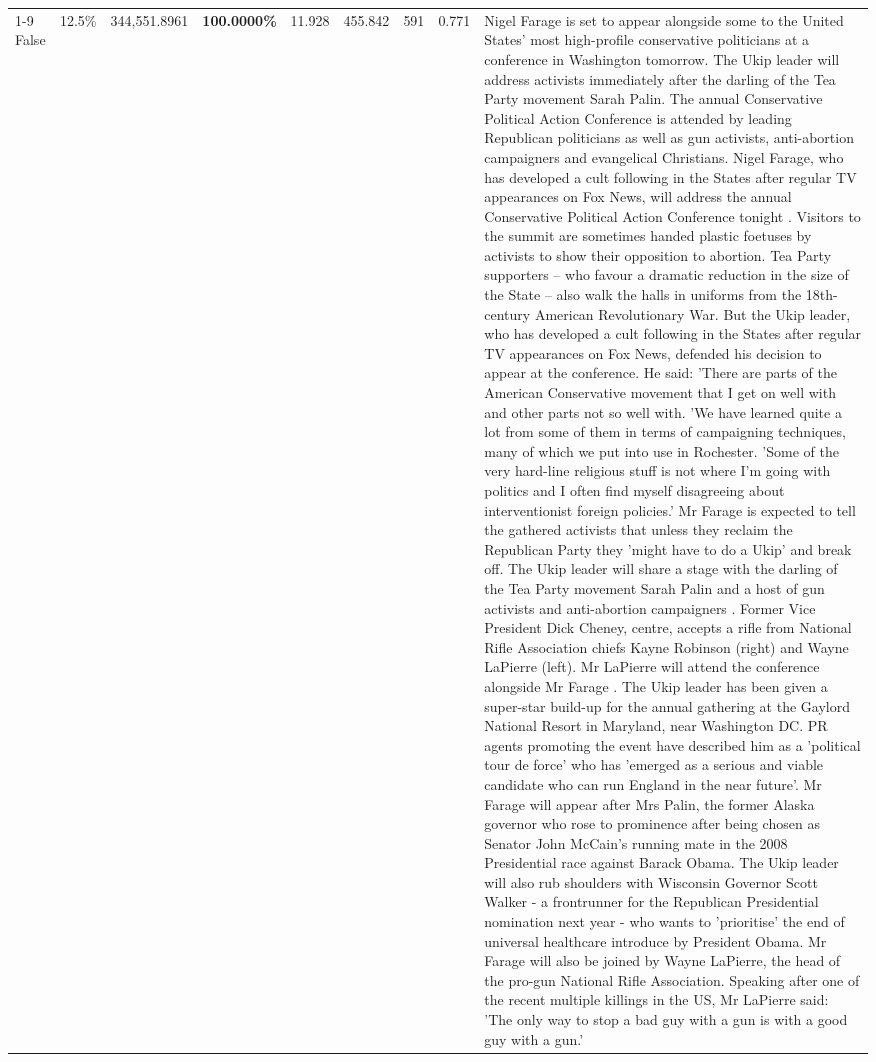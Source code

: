 \begin{table}[H]
\begin{tabular}{lllrlllll}
\cline{1-9}
False & 12.5\% & 344,551.8961 & \bfseries \color{red} 100.0000\% & 11.928 & 455.842 & 591 & 0.771 & Nigel Farage is set to appear alongside some to the United States' most high-profile conservative politicians at a conference in Washington tomorrow. The Ukip leader will address activists immediately after the darling of the Tea Party movement Sarah Palin. The annual Conservative Political Action Conference is attended by leading Republican politicians as well as gun activists, anti-abortion campaigners and evangelical Christians. Nigel Farage, who has developed a cult following in the States after regular TV appearances on Fox News, will address the annual Conservative Political Action Conference tonight . Visitors to the summit are sometimes handed plastic foetuses by activists to show their opposition to abortion. Tea Party supporters – who favour a dramatic reduction in the size of the State – also walk the halls in uniforms from the 18th-century American Revolutionary War. But the Ukip leader, who has developed a cult following in the States after regular TV appearances on Fox News, defended his decision to appear at the conference. He said: 'There are parts of the American Conservative movement that I get on well with and other parts not so well with. 'We have learned quite a lot from some of them in terms of campaigning techniques, many of which we put into use in Rochester. 'Some of the very hard-line religious stuff is not where I'm going with politics and I often find myself disagreeing about interventionist foreign policies.' Mr Farage is expected to tell the gathered activists that unless they reclaim the Republican Party they 'might have to do a Ukip' and break off. The Ukip leader will share a stage with the darling of the Tea Party movement Sarah Palin and a host of gun activists and anti-abortion campaigners . Former Vice President Dick Cheney, centre, accepts a rifle from National Rifle Association chiefs Kayne Robinson (right) and Wayne LaPierre (left). Mr LaPierre will attend the conference alongside Mr Farage . The Ukip leader has been given a super-star build-up for the annual gathering at the Gaylord National Resort in Maryland, near Washington DC. PR agents promoting the event have described him as a 'political tour de force' who has 'emerged as a serious and viable candidate who can run England in the near future'. Mr Farage will appear after Mrs Palin, the former Alaska governor who rose to prominence after being chosen as Senator John McCain's running mate in the 2008 Presidential race against Barack Obama. The Ukip leader will also rub shoulders with Wisconsin Governor Scott Walker - a frontrunner for the Republican Presidential nomination next year - who wants to 'prioritise' the end of universal healthcare introduce by President Obama. Mr Farage will also be joined by Wayne LaPierre, the head of the pro-gun National Rifle Association. Speaking after one of the recent multiple killings in the US, Mr LaPierre said: 'The only way to stop a bad guy with a gun is with a good guy with a gun.'👫 \\

\end{tabular}
\end{table}
